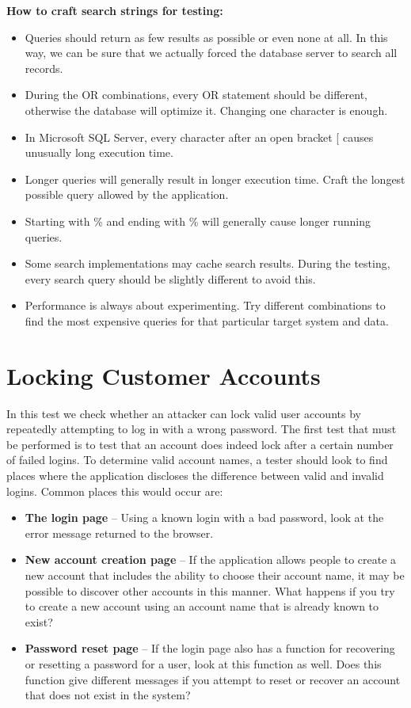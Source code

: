 	{\bf How to craft search strings for testing:} \\
		\begin{itemize}
			\item Queries should return as few results as possible or even none at all. 
			In this way, we can be sure that we actually forced the database server to search all records.
			\item During the OR combinations, every OR statement should be different, otherwise the 
			database will optimize it. Changing one character is enough.
			\item  In Microsoft SQL Server, every character after an open bracket [ causes unusually 
			long execution time. 
			\item Longer queries will generally result in longer execution time. Craft the longest 
			possible query allowed by the application.
			\item Starting with \% and ending with \% will generally cause longer running queries.
			\item Some search implementations may cache search results. During the testing, every
			search query should be slightly different to avoid this.
			\item Performance is always about experimenting. Try different combinations to find the 
			most expensive queries for that particular target system and data.
		\end{itemize}

	\section{Locking Customer Accounts}
		In this test we check whether an attacker can lock valid user accounts by repeatedly attempting 
		to log in with a wrong password. The first test that must be performed is to test that an account 
		does indeed lock after a certain number of failed logins. To determine valid account names, a 
		tester should look to find places where the application discloses the difference between valid and
		invalid logins. Common places this would occur are:
			\begin{itemize}
				\item {\bf The login page} – Using a known login with a bad password, look at the error message
				returned to the browser.
				\item {\bf New account creation page} – If the application allows people to create a new
				account that includes the ability to choose their account name, it may be possible to discover 
				other accounts in this manner. What happens if you try to create a new account using an
				account name that is already known to exist? 
				\item {\bf Password reset page} – If the login page also has a function for recovering or 
				resetting a password for a user, look at this function as well. Does this function 
				give different messages if you attempt to reset or recover an account that does not exist in 
				the system?
			\end{itemize}

